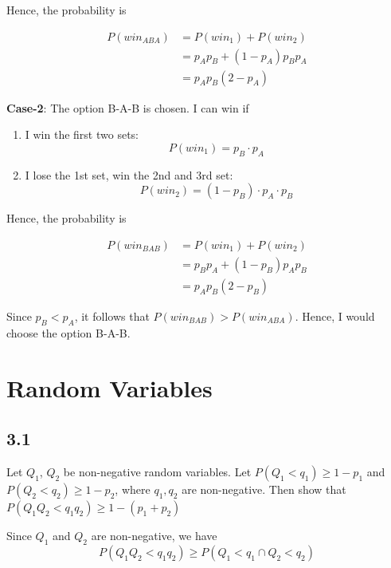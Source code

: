 \documentclass{article}
\begin{document}
Hence, the probability is

\begin{equation}
\begin{aligned}
    P(win_{ABA}) &= P(win_1) + P(win_2) \\
    &= p_A p_B + (1 - p_A) p_B p_A \\
    &= p_A p_B (2 - p_A)
\end{aligned}
\end{equation}

\medskip\textbf{Case-2}: The option B-A-B is chosen. I can win if
\begin{enumerate}
    \item I win the first two sets:
    \begin{equation*}
        P(win_1) = p_B\cdot p_A
    \end{equation*}
    
    \item I lose the 1st set, win the 2nd and 3rd set:
    \begin{equation*}
        P(win_2) = (1-p_B)\cdot p_A\cdot p_B
    \end{equation*}
    
\end{enumerate}

Hence, the probability is

\begin{equation}
\begin{aligned}
    P(win_{BAB}) &= P(win_1) + P(win_2) \\
    &= p_B p_A + (1 - p_B) p_A p_B \\
    &= p_A p_B (2 - p_B)
\end{aligned}
\end{equation}

Since $p_B < p_A$, it follows that $P(win_{BAB}) > P(win_{ABA})$. Hence, I would choose the option B-A-B.

\setcounter{equation}{0}

\section{Random Variables}
\subsection*{3.1}
\begin{tcolorbox}
    Let $Q_1$, $Q_2$ be non-negative random variables. Let $P(Q_1 < q_1) \ge 1-p_1$ and $P(Q_2 < q_2) \ge
    1-p_2$, where $q_1,q_2$ are non-negative. Then show that $P(Q_1Q_2 <q_1q_2) \ge 1-(p_1 + p_2)$
\end{tcolorbox}
Since $Q_1$ and $Q_2$ are non-negative, we have
\begin{equation}
    P(Q_1Q_2<q_1q_2) \ge P(Q_1<q_1 \cap Q_2<q_2)
\end{equation}
\end{document}
